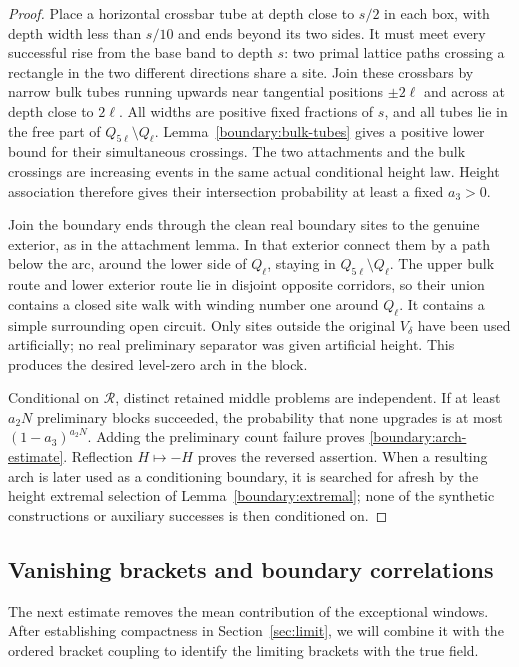 \begin{proof}
Place a horizontal crossbar tube at depth close to $s/2$ in each
box, with depth width less than $s/10$ and ends beyond its two
sides.  It must meet every successful rise from the base band to
depth $s$: two primal lattice paths crossing a rectangle in the
two different directions share a site.  Join these crossbars by
narrow bulk tubes running upwards near tangential positions
$\pm2\ell$ and across at depth close to $2\ell$.  All widths are
positive fixed fractions of $s$, and all tubes lie in the free
part of $Q_{5\ell}\setminus Q_\ell$.
Lemma~\ref{boundary:bulk-tubes} gives a positive lower bound for their
simultaneous crossings.
The two attachments and the bulk crossings are increasing events
in the same actual conditional height law.  Height association
therefore gives their intersection probability at least a fixed
$a_3>0$.

Join the boundary ends through the clean real boundary sites to
the genuine exterior, as in the attachment lemma.  In that exterior
connect them by a path below the arc, around the lower side of
$Q_\ell$, staying in $Q_{5\ell}\setminus Q_\ell$.  The upper bulk
route and lower exterior route lie in disjoint opposite corridors,
so their union contains a closed site walk with winding number one
around $Q_\ell$.  It contains a simple surrounding open circuit.
Only sites outside the original $V_\delta$ have been used
artificially; no real preliminary separator was given artificial
height.  This produces the desired level-zero arch in the block.

Conditional on $\mathcal R$, distinct retained middle problems are
independent.  If at least $a_2N$ preliminary blocks succeeded, the
probability that none upgrades is at most $(1-a_3)^{a_2N}$.
Adding the preliminary count failure proves
\eqref{boundary:arch-estimate}.  Reflection $H\mapsto-H$ proves the
reversed assertion.  When a resulting arch is later used as a
conditioning boundary, it is searched for afresh by the height
extremal selection of Lemma~\ref{boundary:extremal}; none of the
synthetic constructions or auxiliary successes is then conditioned
on.
\end{proof}

\subsection{Vanishing brackets and boundary correlations}

The next estimate removes the mean contribution of the exceptional
windows.  After establishing compactness in Section~\ref{sec:limit},
we will combine it with the ordered bracket coupling to identify the
limiting brackets with the true field.

